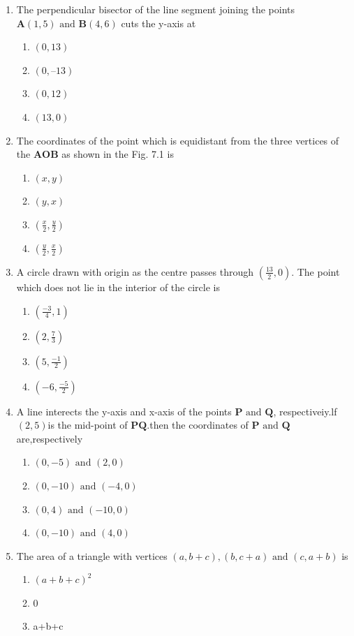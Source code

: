 \documentclass[12pt]{article}
\let\vec\mathbf
\begin{document}
\begin{enumerate}
\item The perpendicular bisector of the line segment joining the points $\vec{A} (1, 5) \text{ and }
\vec{B} (4, 6)$ cuts the y-axis at
\begin{enumerate}
	\item$(0, 13)$ 
	\item $(0, –13)$
	\item$(0, 12) $
	\item$(13, 0)$
\end{enumerate}
\item The coordinates of the point which
	is equidistant from the three vertices of the  $\vec{AOB}$ as shown in the
Fig. 7.1 is
\begin{enumerate}
	\item $(x, y)$
	\item $(y, x)$
	\item $(\frac{x}{2},\frac{y}{2})$
\item $(\frac{y}{2},\frac{x}{2})$
\end{enumerate}
\item A circle drawn with origin as the
centre passes through 
$(\frac{13}{2},0)$. The
point which does not lie in the
interior of the circle is
\begin{enumerate}
\item $(\frac{-3}{4},1)$
\item $(2,\frac{7}{3})$
\item $(5,\frac{-1}{2})$
\item $(-6,\frac{-5}{2})$
\end{enumerate}
\item A line interects the y-axis and x-axis of the points $\vec{P} \text{ and }\vec{Q}$, respectiveiy.lf $(2,5)$is the mid-point of $\vec{PQ}$.then the coordinates of $\vec{P} \text{ and } \vec{Q}$ are,respectively
\begin{enumerate}
	\item$(0,-5)\text{ and }(2,0)$
	\item$(0,-10)\text{ and }(-4,0)$
	\item$(0,4)\text{ and } (-10,0)$
	\item$(0,-10)\text{ and }(4,0)$
\end{enumerate}
\item The area of a triangle with vertices $(a,b+c), (b,c+a)\text{ and }(c,a+b)$ is
\begin{enumerate}
\item $(a+b+c)^2$
\item 0
\item a+b+c

\end{enumerate}
\end{enumerate}
\end{document}
